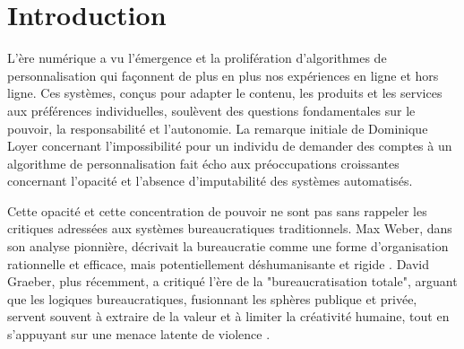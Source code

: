 \documentclass[11pt,a4paper]{article}
\begin{document}
\begin{abstract}
\textbf{Abstract (English):} This report examines the complex intersections between personalization algorithms, theories of bureaucracy, and the imperatives of responsibility in technological development. Responding to specific questions posed by Dominique Loyer, we analyze the link between personalization algorithms and the bureaucratic phenomenon as conceptualized by Max Weber and critiqued by David Graeber, drawing on the works of \cite{SerpaFerreira2019} and \cite{Graeber2015}. We then explore potential steps to modify personalization algorithms deemed predatory, primarily based on the principles of the Montreal Declaration for Responsible AI \cite{DeclarationMontreal2018}, given the inaccessibility of the Praxis Encommun.io reference \cite{PraxisInaccessible}. Finally, inspired by the Biosphere Code \cite{BiosphereCode2015} and faced with the inaccessibility of Laurence Neuer's article \cite{Neuer2018Inaccessible}, we propose a structure and principles for a code of ethics for personalization algorithm developers, emphasizing the human, organizational, and social responsibility inherent in their work. This analysis highlights the opacity, concentration of power, and accountability challenges common to both bureaucratic and algorithmic systems, while outlining pathways for more ethical and responsible development and deployment of personalization technologies. \\ \\
\textbf{Keywords:} Personalization Algorithms, Bureaucracy, Max Weber, David Graeber, Algorithmic Responsibility, AI Ethics, Montreal Declaration, Biosphere Code, Opacity, Power.
\end{abstract}

\section{Introduction}
L'ère numérique a vu l'émergence et la prolifération d'algorithmes de personnalisation qui façonnent de plus en plus nos expériences en ligne et hors ligne. Ces systèmes, conçus pour adapter le contenu, les produits et les services aux préférences individuelles, soulèvent des questions fondamentales sur le pouvoir, la responsabilité et l'autonomie. La remarque initiale de Dominique Loyer concernant l'impossibilité pour un individu de demander des comptes à un algorithme de personnalisation fait écho aux préoccupations croissantes concernant l'opacité et l'absence d'imputabilité des systèmes automatisés.

Cette opacité et cette concentration de pouvoir ne sont pas sans rappeler les critiques adressées aux systèmes bureaucratiques traditionnels. Max Weber, dans son analyse pionnière, décrivait la bureaucratie comme une forme d'organisation rationnelle et efficace, mais potentiellement déshumanisante et rigide \cite{SerpaFerreira2019}. David Graeber, plus récemment, a critiqué l'ère de la "bureaucratisation totale", arguant que les logiques bureaucratiques, fusionnant les sphères publique et privée, servent souvent à extraire de la valeur et à limiter la créativité humaine, tout en s'appuyant sur une menace latente de violence \cite{Graeber2015}.
\end{document}
